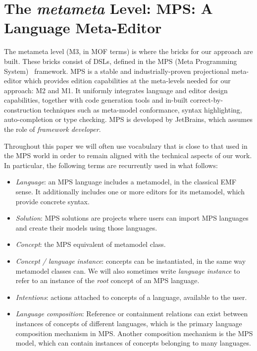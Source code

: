 \section{The \emph{metameta} Level: MPS: A Language Meta-Editor}
\label{sec:metameta}
\vspace{-.2cm}
The metameta level (M3, in MOF terms) is where the bricks for our approach are
built. These bricks consist of DSLs, defined in the MPS (Meta Programming
System)~\cite{mps} framework. MPS is a stable and industrially-proven
projectional meta-editor which provides edition capabilities at the meta-levels
needed for our approach: M2 and M1. It uniformly integrates language and editor
design capabilities, together with code generation tools and in-built
correct-by-construction techniques such as meta-model conformance, syntax
highlighting, auto-completion or type checking.
MPS is developed by JetBrains, which assumes the role of \emph{framework
developer}.

Throughout this paper we will often use vocabulary that is close to that used in
the MPS world in order to remain aligned with the technical aspects of our
work. In particular, the following terms are recurrently used in what follows:
\vspace{-.1cm}
\begin{itemize}
  \item \emph{Language}: an MPS language includes a metamodel, in the classical
  EMF sense. It additionally includes one or more editors for its metamodel,
  which provide concrete syntax.
  \item \emph{Solution}: MPS solutions are projects where users can import
  MPS languages and create their models using those languages.
  \item \emph{Concept}: the MPS equivalent of metamodel class.
  \item \emph{Concept / language instance}: concepts can be instantiated, in
  the same way metamodel classes can. We will also sometimes write
  \emph{language instance} to refer to an instance of the \emph{root} concept of
  an MPS language.
  \item \emph{Intentions}: actions attached to
  concepts of a language, available to the user. 
  \item \emph{Language composition}:  Reference or containment relations can exist between instances of
  concepts of different languages, which is the primary language composition
  mechanism in MPS.
 Another composition mechanism is the MPS model, which can contain instances of
 concepts belonging to many languages.
\end{itemize}
\vspace{-.5cm}
